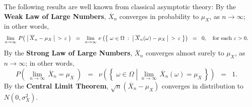 \begin{remark}\quad
The following results are well known from classical asymptotic theory:
\vskip 0.1cm
\noindent
By the \textbf{Weak Law of Large Numbers}, $\overline{X}_{n}$ converges in probability to $\mu_{X}$,
as $n \longrightarrow \infty$; in other words,
\begin{equation*}
\lim_{n\rightarrow\infty}\,P\!\left(\;\left\vert\,\overline{X}_{n} - \mu_{X}\,\right\vert \,>\, \varepsilon\;\right)
\;\;=\;\;
\lim_{n\rightarrow\infty}\,\nu\left(\left\{\;\omega\in\Omega\;:\;\left\vert\,\overline{X}_{n}(\omega) - \mu_{X}\,\right\vert \,>\, \varepsilon\;\right\}\right)
\;\;=\;\; 0,
\quad\textnormal{for each $\varepsilon > 0$}.
\end{equation*}
By the \textbf{Strong Law of Large Numbers}, $\overline{X}_{n}$ converges almost surely to $\mu_{X}$,
as $n \longrightarrow \infty$; in other words,
\begin{equation*}
P\!\left(\;\lim_{n\rightarrow\infty}\,\overline{X}_{n} = \mu_{X}\;\right)
\;\;=\;\;
\nu\left(\left\{\;\omega\in\Omega \;\left\vert\; \lim_{n\rightarrow\infty}\,\overline{X}_{n}(\omega) = \mu_{X} \right. \,\right\}\right)
\;\;=\;\; 1.
\end{equation*}
By the \textbf{Central Limit Theorem}, $\sqrt{n}\left(\overline{X}_{n} - \mu_{X}\right)$ converges in distribution to $N(0,\sigma^{2}_{X})$.
\end{remark}

